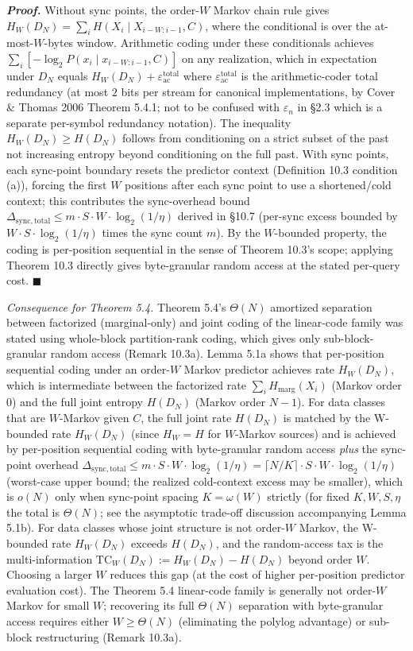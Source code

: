 \documentclass[
]{article}
\begin{document}
\emph{\textbf{Proof.}} Without sync points, the order-$W$ Markov
chain rule gives
$H_W(D_N) = \sum_i H(X_i \mid X_{i-W:i-1}, C)$, where the
conditional is over the at-most-$W$-bytes window. Arithmetic
coding under these conditionals achieves
$\sum_i [-\log_2 P(x_i \mid x_{i-W:i-1}, C)]$ on any realization,
which in expectation under $D_N$ equals
$H_W(D_N) + \varepsilon_{\mathrm{ac}}^{\mathrm{total}}$ where
$\varepsilon_{\mathrm{ac}}^{\mathrm{total}}$ is the
arithmetic-coder total redundancy
(at most $2$ bits per stream for canonical implementations, by
Cover \& Thomas 2006 Theorem 5.4.1; not to be confused with $\varepsilon_n$ in
§2.3 which is a separate per-symbol redundancy notation). The inequality $H_W(D_N) \geq H(D_N)$ follows from
conditioning on a strict subset of the past not increasing entropy
beyond conditioning on the full past. With sync points, each
sync-point boundary resets the predictor context (Definition 10.3
condition (a)), forcing the first $W$ positions after each sync
point to use a shortened/cold context; this contributes the
sync-overhead bound $\Delta_{\mathrm{sync, total}} \leq m \cdot S
\cdot W \cdot \log_2(1/\eta)$ derived in §10.7 (per-sync excess
bounded by $W \cdot S \cdot \log_2(1/\eta)$ times the sync count
$m$). By the $W$-bounded property, the coding is per-position
sequential in the sense of Theorem 10.3's scope; applying Theorem
10.3 directly gives byte-granular random access at the stated
per-query cost. \hfill$\blacksquare$

\emph{Consequence for Theorem 5.4.} Theorem 5.4's $\Theta(N)$
amortized separation between factorized (marginal-only) and joint
coding of the linear-code family was stated using whole-block
partition-rank coding, which gives only sub-block-granular random
access (Remark 10.3a). Lemma 5.1a shows that per-position sequential
coding under an order-$W$ Markov predictor achieves rate
$H_W(D_N)$, which is intermediate between the factorized rate
$\sum_i H_{\mathrm{marg}}(X_i)$ (Markov order 0) and the full joint
entropy $H(D_N)$ (Markov order $N-1$). For data classes that are
$W$-Markov given $C$, the full joint rate $H(D_N)$ is matched by the
W-bounded rate $H_W(D_N)$ (since $H_W = H$ for $W$-Markov sources)
and is achieved by per-position sequential coding with byte-granular
random access \emph{plus} the sync-point overhead
$\Delta_{\mathrm{sync,total}} \leq m \cdot S \cdot W \cdot \log_2(1/\eta)
= \lceil N/K \rceil \cdot S \cdot W \cdot \log_2(1/\eta)$ (worst-case
upper bound; the realized cold-context excess may be smaller), which is
$o(N)$ only when sync-point spacing $K = \omega(W)$ strictly (for
fixed $K, W, S, \eta$ the total is $\Theta(N)$; see the asymptotic
trade-off discussion accompanying Lemma 5.1b). For
data classes whose joint structure is not order-$W$ Markov, the
W-bounded rate $H_W(D_N)$ exceeds $H(D_N)$, and the
random-access tax is the multi-information $\mathrm{TC}_W(D_N) :=
H_W(D_N) - H(D_N)$ beyond order $W$. Choosing a larger $W$ reduces
this gap (at the cost of higher per-position predictor evaluation
cost). The Theorem 5.4 linear-code family is generally not order-$W$
Markov for small $W$; recovering its full $\Theta(N)$ separation with
byte-granular access requires either $W \geq \Theta(N)$ (eliminating
the polylog advantage) or sub-block restructuring (Remark 10.3a).
\end{document}
